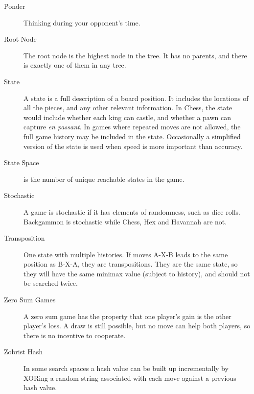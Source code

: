 \begin{description}
\item[Ponder] Thinking during your opponent's time.
\item[Root Node] The root node is the highest node in the tree. It has no parents, and there is exactly one of them in any tree.
\item[State] A state is a full description of a board position. It includes the locations of all the pieces, and any other relevant information. In Chess, the state would include whether each king can castle, and whether a pawn can capture \textit{en passant}. In games where repeated moves are not allowed, the full game history may be included in the state. Occasionally a simplified version of the state is used when speed is more important than accuracy.
\item[State Space] is the number of unique reachable states in the game.
\item[Stochastic] A game is stochastic if it has elements of randomness, such as dice rolls. Backgammon is stochastic while Chess, Hex and Havannah are not.
\item[Transposition] One state with multiple histories. If moves A-X-B leads to the same position as B-X-A, they are transpositions. They are the same state, so they will have the same minimax value (subject to history), and should not be searched twice.
\item[Zero Sum Games] A zero sum game has the property that one player's gain is the other player's loss. A draw is still possible, but no move can help both players, so there is no incentive to cooperate.
\item[Zobrist Hash] In some search spaces a hash value can be built up incrementally by XORing a random string associated with each move against a previous hash value.

\end{description}

